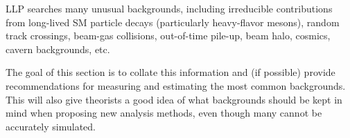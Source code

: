 LLP searches many unusual backgrounds, including irreducible contributions from long-lived SM particle decays (particularly heavy-flavor mesons), random track crossings, beam-gas collisions, out-of-time pile-up, beam halo, cosmics, cavern backgrounds, etc.

The goal of this section is to collate this information and (if possible) provide recommendations for measuring and estimating the most common backgrounds. This will also give theorists a good idea of what backgrounds should be kept in mind when proposing new analysis methods, even though many cannot be accurately simulated.